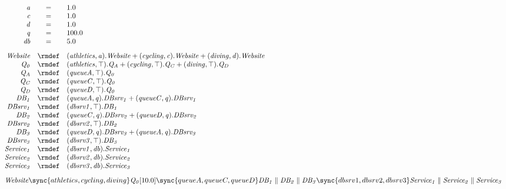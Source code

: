 \begin{displaymath}
	\begin{array}{rcl}
		\mathit{a} & = & 1.0\\
		\mathit{c} & = & 1.0\\
		\mathit{d} & = & 1.0\\
		\mathit{q} & = & 100.0\\
		\mathit{db} & = & 5.0\\
[2.0ex]		\mathit{Website} & \rmdef & (\mathit{athletics},\mathit{a}).\mathit{Website}+(\mathit{cycling},\mathit{c}).\mathit{Website}+(\mathit{diving},\mathit{d}).\mathit{Website}\\
		\mathit{Q_0} & \rmdef & (\mathit{athletics},\top).\mathit{Q_A}+(\mathit{cycling},\top).\mathit{Q_C}+(\mathit{diving},\top).\mathit{Q_D}\\
		\mathit{Q_A} & \rmdef & (\mathit{queueA},\top).\mathit{Q_0}\\
		\mathit{Q_C} & \rmdef & (\mathit{queueC},\top).\mathit{Q_0}\\
		\mathit{Q_D} & \rmdef & (\mathit{queueD},\top).\mathit{Q_0}\\
		\mathit{DB_1} & \rmdef & (\mathit{queueA},\mathit{q}).\mathit{DBsrv_1}+(\mathit{queueC},\mathit{q}).\mathit{DBsrv_1}\\
		\mathit{DBsrv_1} & \rmdef & (\mathit{dbsrv1},\top).\mathit{DB_1}\\
		\mathit{DB_2} & \rmdef & (\mathit{queueC},\mathit{q}).\mathit{DBsrv_2}+(\mathit{queueD},\mathit{q}).\mathit{DBsrv_2}\\
		\mathit{DBsrv_2} & \rmdef & (\mathit{dbsrv2},\top).\mathit{DB_2}\\
		\mathit{DB_3} & \rmdef & (\mathit{queueD},\mathit{q}).\mathit{DBsrv_3}+(\mathit{queueA},\mathit{q}).\mathit{DBsrv_3}\\
		\mathit{DBsrv_3} & \rmdef & (\mathit{dbsrv3},\top).\mathit{DB_3}\\
		\mathit{Service_1} & \rmdef & (\mathit{dbsrv1},\mathit{db}).\mathit{Service_1}\\
		\mathit{Service_2} & \rmdef & (\mathit{dbsrv2},\mathit{db}).\mathit{Service_2}\\
		\mathit{Service_3} & \rmdef & (\mathit{dbsrv3},\mathit{db}).\mathit{Service_3}\\
[2.0ex]		\multicolumn{3}{l}{\mathit{Website}\sync{athletics,cycling,diving}\mathit{Q_0}[10.0]\sync{queueA,queueC,queueD}\mathit{DB_1}\parallel\mathit{DB_2}\parallel\mathit{DB_3}\sync{dbsrv1,dbsrv2,dbsrv3}\mathit{Service_1}\parallel\mathit{Service_2}\parallel\mathit{Service_3}}\\
[2.0ex]	\end{array}
\end{displaymath}
